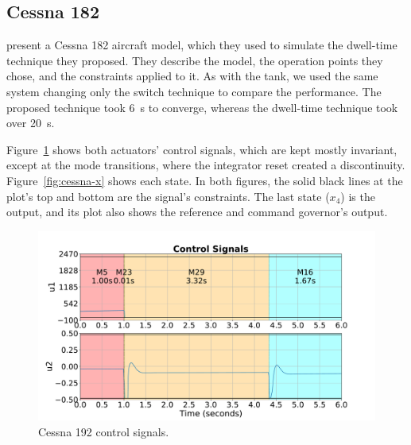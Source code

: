 \FloatBarrier

\subsection{Cessna 182}%
\label{subsec:cessna}

\textcite{franzè.lucia.ea:command} present a Cessna 182 aircraft model, which
they used to simulate the dwell-time technique they proposed. They describe the
model, the operation points they chose, and the constraints applied to it. As
with the tank, we used the same system changing only the switch technique to
compare the performance. The proposed technique took \SI{6}{\second} to
converge, whereas the dwell-time technique took over \SI{20}{\second}.

Figure~\ref{fig:cessna-u} shows both actuators' control signals, which are kept
mostly invariant, except at the mode transitions, where the integrator reset
created a discontinuity. Figure~\ref{fig:cessna-x} shows each state. In both
figures, the solid black lines at the plot's top and bottom are the signal's
constraints. The last state (\(x_{4}\)) is the output, and its plot also shows
the reference and command governor's output.

\begin{figure}[ht!]
  \centering
  \includegraphics[height=0.3\textheight]{imgs/cessna-u}
  \caption{Cessna 192 control signals.}%
  \label{fig:cessna-u}
\end{figure}

